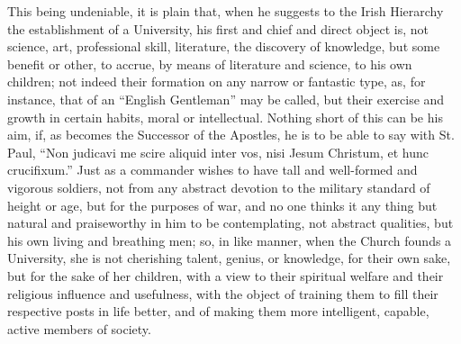 This being undeniable, it is plain that, when he suggests to the
Irish Hierarchy the establishment of a University, his first and chief
and direct object is, not science, art, professional skill, literature,
the discovery of knowledge, but some benefit or other, to accrue, by
means of literature and science, to his own children; not indeed their
formation on any narrow or fantastic type, as, for instance, that of an
``English Gentleman'' may be called, but their exercise and
growth in certain habits, moral or intellectual. Nothing short of this
can be his aim, if, as becomes the Successor of the Apostles, he is to
be able to say with St. Paul, ``Non judicavi me scire aliquid inter
vos, nisi Jesum Christum, et hunc crucifixum.'' Just as a commander
wishes to have tall and well-formed and vigorous soldiers, not from any
abstract devotion to the military standard of height or age, but for the
purposes of war, and no one thinks it any thing but natural and
praiseworthy in him to be contemplating, not abstract qualities, but his
own living and breathing men; so, in like manner, when the Church founds
a University, she is not cherishing talent, genius, or knowledge, for
their own sake, but for the sake of her children, with a view to their
spiritual welfare and their religious influence and usefulness, with the
object of training them to fill their respective posts in life better,
and of making them more intelligent, capable, active members of society.

